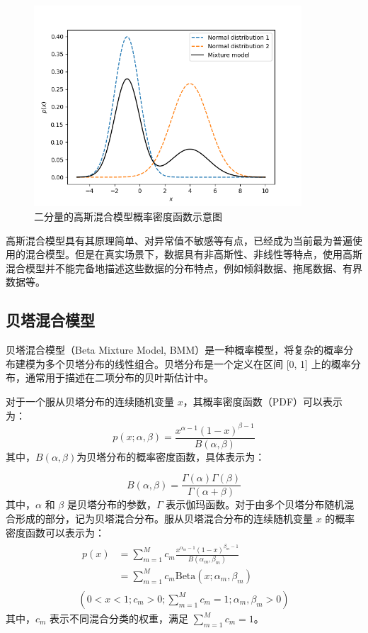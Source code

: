 \begin{figure}[ht!]
  \centering
  \includegraphics[width=10cm]{pic/chapter4/GMM.png}
  \caption{二分量的高斯混合模型概率密度函数示意图}
  \label{GMM}
\end{figure}

高斯混合模型具有其原理简单、对异常值不敏感等有点，已经成为当前最为普遍使用的混合模型。但是在真实场景下，数据具有非高斯性、非线性等特点，使用高斯混合模型并不能完备地描述这些数据的分布特点，例如倾斜数据、拖尾数据、有界数据等。

\subsection{贝塔混合模型}
贝塔混合模型（Beta Mixture Model, BMM）是一种概率模型，将复杂的概率分布建模为多个贝塔分布的线性组合。贝塔分布是一个定义在区间 [0, 1] 上的概率分布，通常用于描述在二项分布的贝叶斯估计中。

对于一个服从贝塔分布的连续随机变量 $x$，其概率密度函数（PDF）可以表示为：
\begin{equation}
  \label{eq:beta1}
  p(x; \alpha, \beta) = \frac{x^{\alpha - 1} (1 - x)^{\beta - 1}}{B(\alpha, \beta)}
\end{equation}
其中，$B(\alpha, \beta)$为贝塔分布的概率密度函数，具体表示为：

\begin{equation}
  B(\alpha, \beta) = \frac{\Gamma(\alpha) \Gamma(\beta)}{\Gamma(\alpha + \beta)}
\end{equation}
其中，$\alpha$ 和 $\beta$ 是贝塔分布的参数，$\Gamma$ 表示伽玛函数。对于由多个贝塔分布随机混合形成的部分，记为贝塔混合分布。服从贝塔混合分布的连续随机变量 $x$ 的概率密度函数可以表示为：
\begin{equation}
  \label{eq:beta}
  \begin{gathered}
    \begin{aligned}
      p(x) & = \sum_{m=1}^M c_m \frac{x^{\alpha_m - 1} (1 - x)^{\beta_m - 1}}{B(\alpha_m, \beta_m)} \\
           & = \sum_{m=1}^M c_m \text{Beta}(x; \alpha_m, \beta_m)
    \end{aligned}
    \\
    (0 < x < 1; c_m > 0; \sum_{m=1}^M c_m = 1; \alpha_m, \beta_m > 0)
  \end{gathered}
\end{equation}
其中，$c_m$ 表示不同混合分类的权重，满足 $\sum_{m=1}^M c_m=1$。

